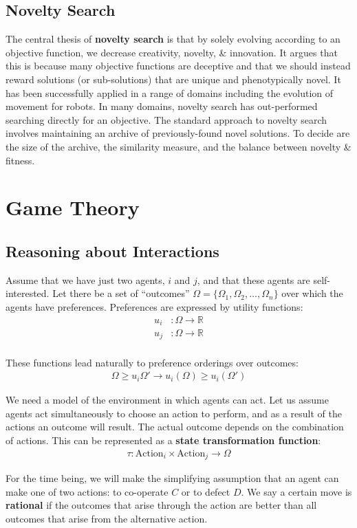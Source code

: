 \documentclass[a4paper,11pt]{article}
\begin{document}
\subsection{Novelty Search}
The central thesis of \textbf{novelty search} is that by solely evolving according to an objective function, we decrease creativity, novelty, \& innovation.
It argues that this is because many objective functions are deceptive and that we should instead reward solutions (or sub-solutions) that are unique and phenotypically novel.
It has been successfully applied in a range of domains including the evolution of movement for robots.
In many domains, novelty search has out-performed searching directly for an objective.
The standard approach to novelty search involves maintaining an archive of previously-found novel solutions.
To decide are the size of the archive, the similarity measure, and the balance between novelty \& fitness.

\section{Game Theory}
\subsection{Reasoning about Interactions}
Assume that we have just two agents, $i$ and $j$, and that these agents are self-interested.
Let there be a set of ``outcomes'' $\Omega = \{ \Omega_1, \Omega_2, \dots, \Omega_n \}$ over which the agents have preferences.
Preferences are expressed by utility functions:
\begin{align*}
    u_i& : \Omega \rightarrow \mathbb{R} \\
    u_j& : \Omega \rightarrow \mathbb{R} \\
\end{align*}

These functions lead naturally to preference orderings over outcomes:
\begin{align*}
    \Omega \geq u_i \Omega' \rightarrow u_i(\Omega) \geq u_i(\Omega')
\end{align*}

We need a model of the environment in which agents can act.
Let us assume agents act simultaneously to choose an action to perform, and as a result of the actions an outcome will result.
The actual outcome depends on the combination of actions.
This can be represented as a \textbf{state transformation function}:
\begin{align*}
    \tau: \text{Action}_i \times \text{Action}_j \rightarrow \Omega
\end{align*}

For the time being, we will make the simplifying assumption that an agent can make one of two actions: to co-operate $C$ or to defect $D$.
We say a certain move is \textbf{rational} if the outcomes that arise through the action are better than all outcomes that arise from the alternative action.
\end{document}
